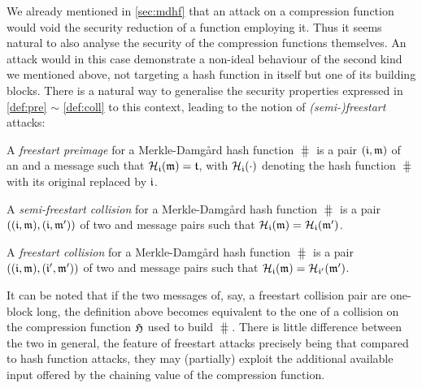 \bigskip

We already mentioned in \autoref{sec:mdhf} that an attack on a compression function would void the security reduction of a \merkdam function employing it. Thus it seems natural to also
analyse the security of the compression functions themselves. An attack would in this case demonstrate a non-ideal behaviour of the second kind we mentioned above, not targeting
a hash function in itself but one of its building blocks. There is a natural way to generalise the security properties expressed in \autoref{def:pre} $\sim$ \autoref{def:coll} to this context,
leading to the notion of \emph{(semi-)freestart} attacks:

\begin{defi}
A \emph{freestart preimage} for a Merkle-Damg\aa rd hash function $\hash$ is a pair $(\mathfrak{i},\mathfrak{m})$
of an \iv and a message such that $\operatorname{\mathcal{H}}_{\mathfrak{i}}(\mathfrak{m}) = \mathfrak{t}$, with $\operatorname{\mathcal{H}}_{\mathfrak{i}}(\cdot)$ denoting
the hash function $\hash$ with its original \iv replaced by $\mathfrak{i}$.
\label{def:free_pre}
\end{defi}

\begin{defi}
A \emph{semi-freestart collision} for a Merkle-Damg\aa rd hash function $\hash$ is a pair $((\mathfrak{i},\mathfrak{m}), (\mathfrak{i},\mathfrak{m}'))$
of two \iv and message pairs such that $\operatorname{\mathcal{H}}_{\mathfrak{i}}(\mathfrak{m}) = \operatorname{\mathcal{H}}_{\mathfrak{i}}(\mathfrak{m}')$.
\label{def:semi-free_coll}
\end{defi}

\begin{defi}
A \emph{freestart collision} for a Merkle-Damg\aa rd hash function $\hash$ is a pair $((\mathfrak{i},\mathfrak{m}), (\mathfrak{i}',\mathfrak{m}'))$
of two \iv and message pairs such that $\operatorname{\mathcal{H}}_{\mathfrak{i}}(\mathfrak{m}) = \operatorname{\mathcal{H}}_{\mathfrak{i}'}(\mathfrak{m}')$.
\label{def:free_coll}
\end{defi}

It can be noted that if the two messages of, say, a freestart collision pair are one-block long, the definition above becomes equivalent to the one of a collision
on the compression function $\operatorname{\mathfrak{H}}$ used to build $\hash$.
There is little difference between the two in general, the feature of freestart attacks precisely being that compared to hash function attacks, they may (partially) exploit the additional available input offered by the chaining value
of the compression function.


\bigskip

